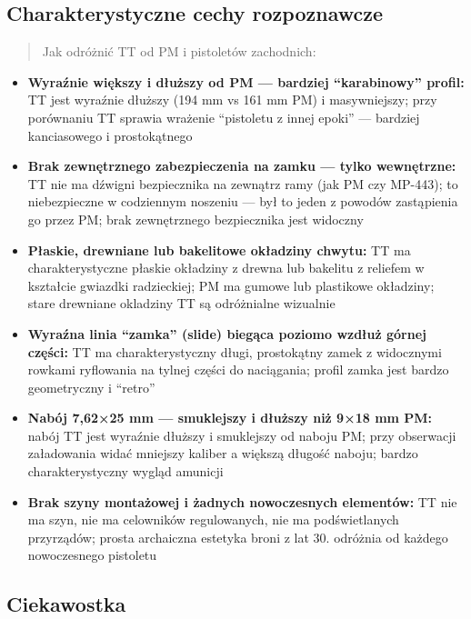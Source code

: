 \documentclass[12pt,oneside]{book}
\providecommand{\tightlist}{%
  \setlength{\itemsep}{0pt}\setlength{\parskip}{0pt}}
\begin{document}
\subsection{Charakterystyczne cechy
rozpoznawcze}\label{charakterystyczne-cechy-rozpoznawcze-102}

\begin{quote}
Jak odróżnić TT od PM i pistoletów zachodnich:
\end{quote}

\begin{itemize}
\tightlist
\item
  \textbf{Wyraźnie większy i dłuższy od PM --- bardziej ``karabinowy''
  profil:} TT jest wyraźnie dłuższy (194 mm vs 161 mm PM) i
  masywniejszy; przy porównaniu TT sprawia wrażenie ``pistoletu z innej
  epoki'' --- bardziej kanciasowego i prostokątnego
\item
  \textbf{Brak zewnętrznego zabezpieczenia na zamku --- tylko
  wewnętrzne:} TT nie ma dźwigni bezpiecznika na zewnątrz ramy (jak PM
  czy MP-443); to niebezpieczne w codziennym noszeniu --- był to jeden z
  powodów zastąpienia go przez PM; brak zewnętrznego bezpiecznika jest
  widoczny
\item
  \textbf{Płaskie, drewniane lub bakelitowe okładziny chwytu:} TT ma
  charakterystyczne płaskie okładziny z drewna lub bakelitu z reliefem w
  kształcie gwiazdki radzieckiej; PM ma gumowe lub plastikowe okładziny;
  stare drewniane okladziny TT są odróżnialne wizualnie
\item
  \textbf{Wyraźna linia ``zamka'' (slide) biegąca poziomo wzdłuż górnej
  części:} TT ma charakterystyczny długi, prostokątny zamek z widocznymi
  rowkami ryflowania na tylnej części do naciągania; profil zamka jest
  bardzo geometryczny i ``retro''
\item
  \textbf{Nabój 7,62×25 mm --- smuklejszy i dłuższy niż 9×18 mm PM:}
  nabój TT jest wyraźnie dłuższy i smuklejszy od naboju PM; przy
  obserwacji załadowania widać mniejszy kaliber a większą długość
  naboju; bardzo charakterystyczny wygląd amunicji
\item
  \textbf{Brak szyny montażowej i żadnych nowoczesnych elementów:} TT
  nie ma szyn, nie ma celowników regulowanych, nie ma podświetlanych
  przyrządów; prosta archaiczna estetyka broni z lat 30. odróżnia od
  każdego nowoczesnego pistoletu
\end{itemize}

\subsection{Ciekawostka}\label{ciekawostka-102}
\end{document}
